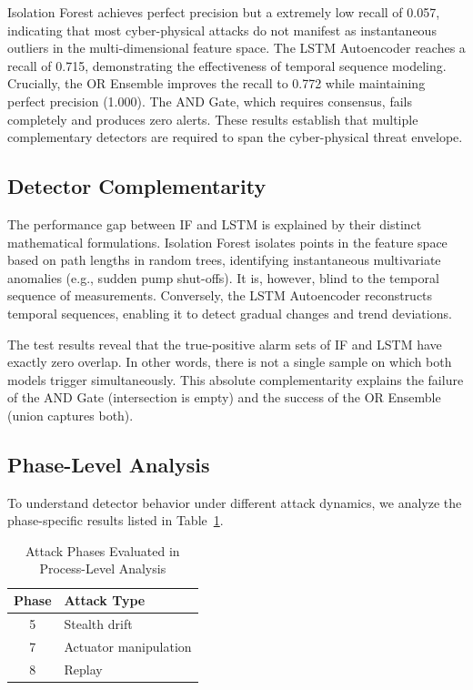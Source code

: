 \documentclass[journal,twoside,web]{ieeecolor}
\begin{document}
Isolation Forest achieves perfect precision but a extremely low recall of 0.057, indicating that most cyber-physical attacks do not manifest as instantaneous outliers in the multi-dimensional feature space. The LSTM Autoencoder reaches a recall of 0.715, demonstrating the effectiveness of temporal sequence modeling. Crucially, the OR Ensemble improves the recall to 0.772 while maintaining perfect precision (1.000). The AND Gate, which requires consensus, fails completely and produces zero alerts. These results establish that multiple complementary detectors are required to span the cyber-physical threat envelope.

\subsection{Detector Complementarity} \label{subsec:complementarity}
The performance gap between IF and LSTM is explained by their distinct mathematical formulations. Isolation Forest isolates points in the feature space based on path lengths in random trees, identifying instantaneous multivariate anomalies (e.g., sudden pump shut-offs). It is, however, blind to the temporal sequence of measurements. Conversely, the LSTM Autoencoder reconstructs temporal sequences, enabling it to detect gradual changes and trend deviations.

The test results reveal that the true-positive alarm sets of IF and LSTM have exactly zero overlap. In other words, there is not a single sample on which both models trigger simultaneously. This absolute complementarity explains the failure of the AND Gate (intersection is empty) and the success of the OR Ensemble (union captures both).

\subsection{Phase-Level Analysis} \label{subsec:phase_analysis}
To understand detector behavior under different attack dynamics, we analyze the phase-specific results listed in Table~\ref{tab:phase_attacks}.
\begin{table}[!t]
\caption{Attack Phases Evaluated in Process-Level Analysis}
\label{tab:phase_attacks}
\centering
\setlength{\tabcolsep}{6pt}
\begin{tabular}{cl}
\toprule
Phase & Attack Type \\
\midrule
5 & Stealth drift \\
7 & Actuator manipulation \\
8 & Replay \\
\bottomrule
\end{tabular}
\end{table}
\end{document}
